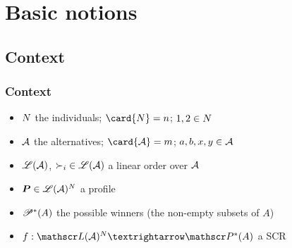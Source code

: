 \documentclass[french, english]{beamer}
\begin{document}

\section{Basic notions}
\subsection{Context}
\begin{frame}
	\frametitle{Context}
	\begin{itemize}
		\item $N$ the individuals; $\card{\voters} = n$; $1, 2 \in N$
		\item $\mathcal{A}$ the alternatives; $\card{\allalts} = m$; $a, b, x, y \in \mathcal{A}$
		\item $\mathscr{L}(\mathcal{A})$, ${\prefi} \in \linors$ a linear order over $\mathcal{A}$
		\item $\boldsymbol{P} \in \mathscr{L}(\mathcal{A})^N$ a profile
		\item $\mathscr{P}^*(A)$ the possible winners (the non-empty subsets of $A$)
		\item $f: \linors^\voters → \powersetz{A}$ a \ac{SCR}
	\end{itemize}
	\begin{example}[A profile]
		\centering
	\end{example}
\end{frame}
\end{document}
